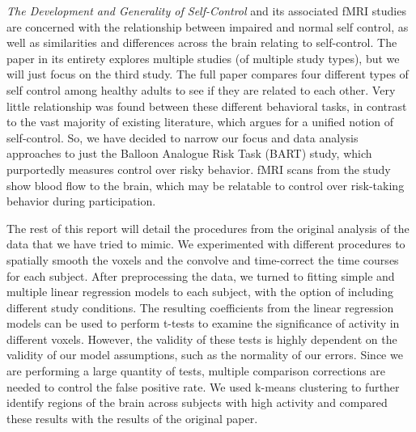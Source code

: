 \par \textit{The Development and Generality of Self-Control} \cite
{CohenSelfControl} and its associated fMRI studies are concerned with the 
relationship between impaired and normal self control, as well as 
similarities and differences across the brain relating to self-control. The 
paper in its entirety explores multiple studies (of multiple study types), 
but we will just focus on the third study. The full paper compares four 
different types of self control among healthy adults to see if they are 
related to each other. Very little relationship was found between these 
different behavioral tasks, in contrast to the vast majority of existing 
literature,  which argues for a unified notion of self-control. So, we have 
decided to narrow our focus and data analysis approaches to just the Balloon 
Analogue Risk Task (BART) study, which purportedly measures control over risky 
behavior. fMRI scans from the study show blood flow to the brain, which may 
be relatable to control over risk-taking behavior during participation.

\par The rest of this report will detail the procedures from the original 
analysis of the data that we have tried to mimic. We experimented with 
different procedures to spatially smooth the voxels and the convolve and 
time-correct the time courses for each subject. After preprocessing the data, we 
turned to fitting simple and multiple linear regression models to each subject, 
with the option of including different study conditions. The resulting 
coefficients from the linear regression models can be used to perform t-tests 
to examine the significance of activity in different voxels. However, the 
validity of these tests is highly dependent on the validity of our model 
assumptions, such as the normality of our errors. Since we are performing a 
large quantity of tests, multiple comparison corrections are needed to control 
the false positive rate. We used k-means clustering to further identify regions 
of the brain across subjects with high activity and compared these results with 
the results of the original paper. 
